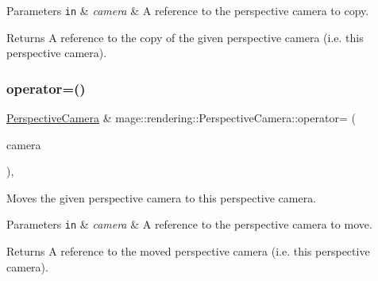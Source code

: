 \begin{DoxyParams}[1]{Parameters}
\mbox{\tt in}  & {\em camera} & A reference to the perspective camera to copy. \\
\hline
\end{DoxyParams}
\begin{DoxyReturn}{Returns}
A reference to the copy of the given perspective camera (i.\+e. this perspective camera). 
\end{DoxyReturn}
\hypertarget{classmage_1_1rendering_1_1_perspective_camera_ac5b98cb14cd16dffd1a46c4e52ef72a8}{}\label{classmage_1_1rendering_1_1_perspective_camera_ac5b98cb14cd16dffd1a46c4e52ef72a8} 
\subsubsection{\texorpdfstring{operator=()}{operator=()}\hspace{0.1cm}{\footnotesize\ttfamily [2/2]}}
{\footnotesize\ttfamily \hyperlink{classmage_1_1rendering_1_1_perspective_camera}{Perspective\+Camera} \& mage\+::rendering\+::\+Perspective\+Camera\+::operator= (\begin{DoxyParamCaption}\item[{\hyperlink{classmage_1_1rendering_1_1_perspective_camera}{Perspective\+Camera} \&\&}]{camera }\end{DoxyParamCaption})\hspace{0.3cm}{\ttfamily [default]}, {\ttfamily [noexcept]}}

Moves the given perspective camera to this perspective camera.


\begin{DoxyParams}[1]{Parameters}
\mbox{\tt in}  & {\em camera} & A reference to the perspective camera to move. \\
\hline
\end{DoxyParams}
\begin{DoxyReturn}{Returns}
A reference to the moved perspective camera (i.\+e. this perspective camera). 
\end{DoxyReturn}
\hypertarget{classmage_1_1rendering_1_1_perspective_camera_a180f74e8b39609aee8dcc2741a74076f}{}\label{classmage_1_1rendering_1_1_perspective_camera_a180f74e8b39609aee8dcc2741a74076f} 
